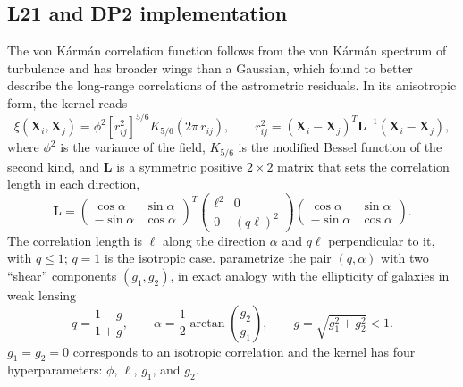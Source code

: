 \subsection{L21 and DP2 implementation}
\label{sec:l21}

The von K\'arm\'an correlation function follows from the von K\'arm\'an spectrum of turbulence and has broader wings than a 
Gaussian, which  found to better describe the long-range correlations of the astrometric residuals.
In its anisotropic form, the kernel reads
\begin{equation}
\label{eq:vk}
\xi(\mathbf{X}_i, \mathbf{X}_j) = \phi^2 \left[ r_{ij}^2 \right]^{5/6} K_{5/6}\!\left( 2\pi\, r_{ij} \right), \qquad r_{ij}^2 = (\mathbf{X}_i - \mathbf{X}_j)^T \mathbf{L}^{-1} (\mathbf{X}_i - \mathbf{X}_j),
\end{equation}
where $\phi^2$ is the variance of the field, $K_{5/6}$ is the modified Bessel function of the second kind, and $\mathbf{L}$ is a 
symmetric positive $2 \times 2$ matrix that sets the correlation length in each direction,
\begin{equation}
\label{eq:L}
\mathbf{L} = \begin{pmatrix} \cos\alpha & \sin\alpha \\ -\sin\alpha & \cos\alpha \end{pmatrix}^T
\begin{pmatrix} \ell^2 & 0 \\ 0 & (q\ell)^2 \end{pmatrix}
\begin{pmatrix} \cos\alpha & \sin\alpha \\ -\sin\alpha & \cos\alpha \end{pmatrix}.
\end{equation}
The correlation length is $\ell$ along the direction $\alpha$ and $q\ell$ perpendicular to it, with $q \le 1$; $q = 1$ is the isotropic case.
 parametrize the pair $(q, \alpha)$ with two ``shear'' components $(g_1, g_2)$, in exact analogy with the
ellipticity of galaxies in weak lensing\NEW{:}
\begin{equation}
\label{eq:shear}
{q = \frac{1 - g}{1 + g}, \qquad \alpha = \frac{1}{2} \arctan\left(\frac{g_2}{g_1}\right), \qquad g = \sqrt{g_1^2 + g_2^2} < 1 .}
\end{equation}
 $g_1 = g_2 = 0$ corresponds to an isotropic correlation and the kernel has four
hyperparameters: $\phi$, $\ell$, $g_1$, and $g_2$.

